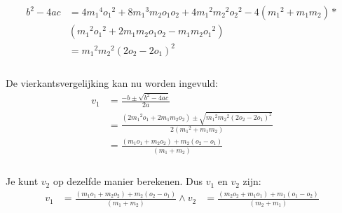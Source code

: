 \documentclass[12pt,a4paper]{article}
\begin{document}
	\begin{equation}
		\begin{aligned}
				b^2-4ac&=4{m_1}^4{o_1}^2+8{m_1}^3m_2o_1o_2+4{m_1}^2{m_2}^2{o_2}^2-4\left({m_1}^2+m_1m_2\right)*\\
			&\left({m_1}^2{o_1}^2+2m_1m_2o_1o_2-m_1m_2{o_1}^2\right)\\
			&={m_1}^2{m_2}^2{\left(2o_2-2o_1\right)}^2\\
		\end{aligned}
	\end{equation}
	\\De vierkantsvergelijking kan nu worden ingevuld:
	\begin{equation}
		\begin{aligned}
			v_1&=\frac{-b\pm\sqrt{b^2-4ac}}{2a}\\
			&=\frac{\left(2{m_1}^2o_1+2m_1m_2o_2\right)\pm\sqrt{{m_1}^2{m_2}^2{\left(2o_2-2o_1\right)}^2}}{2\left({m_1}^2+m_1m_2\right)}\\
			&=\frac{\left(m_1o_1+m_2o_2\right)+m_2\left(o_2-o_1\right)}{\left(m_1+m_2\right)}\\
		\end{aligned}
	\end{equation}
	\\Je kunt $v_2$ op dezelfde manier berekenen. Dus $v_1$ en $v_2$ zijn:
	\begin{equation}
		\begin{aligned}
		\label{uitwerking-energie-impuls}
			v_1&=\frac{\left(m_1o_1+m_2o_2\right)+m_2\left(o_2-o_1\right)}{\left(m_1+m_2\right)} \wedge v_2&=\frac{\left(m_2o_2+m_1o_1\right)+m_1\left(o_1-o_2\right)}{\left(m_2+m_1\right)}\\
		\end{aligned}
	\end{equation}
\end{document}
